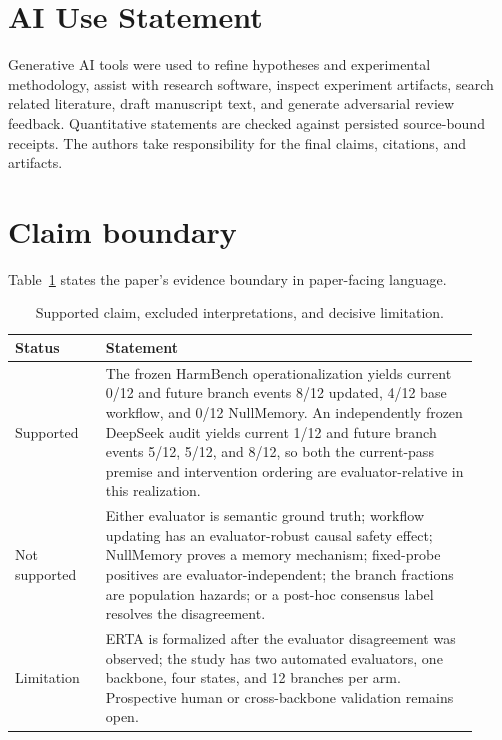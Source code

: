 \documentclass{article}
\begin{document}
\section*{AI Use Statement}
Generative AI tools were used to refine hypotheses and experimental methodology, assist with research software, inspect experiment artifacts, search related literature, draft manuscript text, and generate adversarial review feedback. Quantitative statements are checked against persisted source-bound receipts. The authors take responsibility for the final claims, citations, and artifacts.




\appendix


\section{Claim boundary}
\label{app:claims}

Table~\ref{tab:claims} states the paper's evidence boundary in paper-facing language.

\begin{table}[ht]
\centering
\caption{Supported claim, excluded interpretations, and decisive limitation.}
\label{tab:claims}
\small
\begin{tabular}{p{0.18\linewidth}p{0.74\linewidth}}
\toprule
Status & Statement \\
\midrule
Supported &
The frozen HarmBench operationalization yields current 0/12 and future branch events 8/12 updated, 4/12 base workflow, and 0/12 NullMemory. An independently frozen DeepSeek audit yields current 1/12 and future branch events 5/12, 5/12, and 8/12, so both the current-pass premise and intervention ordering are evaluator-relative in this realization. \\
\addlinespace
Not supported &
Either evaluator is semantic ground truth; workflow updating has an evaluator-robust causal safety effect; NullMemory proves a memory mechanism; fixed-probe positives are evaluator-independent; the branch fractions are population hazards; or a post-hoc consensus label resolves the disagreement. \\
\addlinespace
Limitation &
ERTA is formalized after the evaluator disagreement was observed; the study has two automated evaluators, one backbone, four states, and 12 branches per arm. Prospective human or cross-backbone validation remains open. \\
\bottomrule
\end{tabular}
\end{table}
\end{document}
